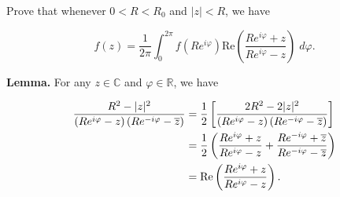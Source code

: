 Prove that whenever $0 < R < R_0$ and $|z| < R$, we have

$$
f(z) = \frac{1}{2 \pi} \int_{0}^{2 \pi} f(Re^{i \varphi}) \text{Re} \left( \frac{Re^{i \varphi} + z}{Re^{i \varphi} - z} \right) \; d\varphi.
$$

\textbf{Lemma.} For any $z \in \mathbb{C}$ and $\varphi \in \mathbb{R}$, we have

\begin{align*}
    \frac{R^2 - |z|^2}{\left(R e^{i \varphi} - z\right)\left(R e^{-i \varphi} - \overline{z}\right)}
    &= \frac{1}{2} \left[ \frac{2R^2 - 2|z|^2}{\left(R e^{i \varphi} - z\right)\left(R e^{-i \varphi} - \overline{z}\right)} \right] \\
    &= \frac{1}{2} \left( \frac{R e^{i \varphi} + z}{R e^{i \varphi} - z} + \frac{R e^{-i\varphi} + \overline{z}}{R e^{-i \varphi} - \overline{z}} \right) \\
    &= \text{Re} \left( \frac{R e^{i \varphi} + z}{R e^{i \varphi} - z} \right).
\end{align*}

